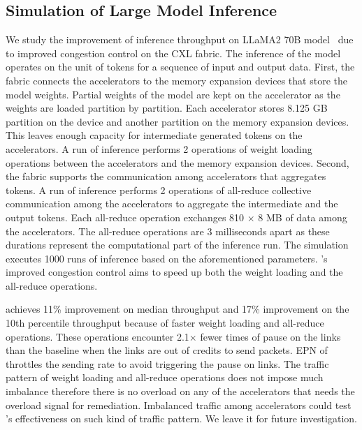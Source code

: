 \subsection{Simulation of Large Model Inference}
\label{aurelia:sec:eval:inf}
%
We study the improvement of inference throughput on LLaMA2 70B model~\cite{llama:arxiv:2023} due to improved congestion control on the CXL fabric.
%
The inference of the model operates on the unit of tokens for a sequence of input and output data.
%
First, the fabric connects the accelerators to the memory expansion devices that store the model weights.
%
Partial weights of the model are kept on the accelerator as the weights are loaded partition by partition.  
%
Each accelerator stores 8.125 GB partition on the device and another partition on the memory expansion devices.
%
This leaves enough capacity for intermediate generated tokens on the accelerators.
%
A run of inference performs 2 operations of weight loading operations between the accelerators and the memory expansion devices.
%
Second, the fabric supports the communication among accelerators that aggregates tokens.
%
A run of inference performs 2 operations of all-reduce collective communication among the accelerators to aggregate the intermediate and the output tokens.
%
Each all-reduce operation exchanges 810 $\times$ 8 MB of data among the accelerators.
%
The all-reduce operations are 3 milliseconds apart as these durations represent the computational part of the inference run.
%
The simulation executes 1000 runs of inference based on the aforementioned parameters.  
%
\aurelia's improved congestion control aims to speed up both the weight loading and the all-reduce operations.
%

\aurelia achieves 11\% improvement on median throughput and 17\% improvement on the 10th percentile throughput because of faster weight loading and all-reduce operations. 
%
These operations encounter 2.1$\times$ fewer times of pause on the links than the baseline when the links are out of credits to send packets.
%
EPN of \aurelia throttles the sending rate to avoid triggering the pause on links. 
%
The traffic pattern of weight loading and all-reduce operations does not impose much imbalance therefore there is no overload on any of the accelerators that needs the overload signal for remediation.
%
Imbalanced traffic among accelerators could test \aurelia's effectiveness on such kind of traffic pattern. 
%
We leave it for future investigation.


